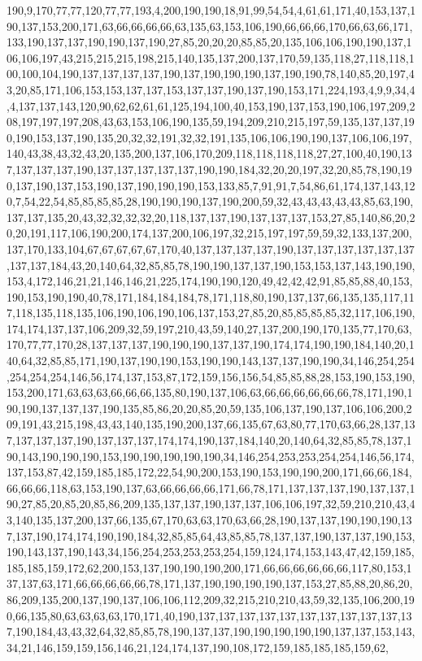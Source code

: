 190,9,170,77,77,120,77,77,193,4,200,190,190,18,91,99,54,54,4,61,61,171,40,153,137,190,137,153,200,171,63,66,66,66,66,63,135,63,153,106,190,66,66,66,170,66,63,66,171,133,190,137,137,190,190,137,190,27,85,20,20,20,85,85,20,135,106,106,190,190,137,106,106,197,43,215,215,215,198,215,140,135,137,200,137,170,59,135,118,27,118,118,100,100,104,190,137,137,137,137,190,137,190,190,190,137,190,190,78,140,85,20,197,43,20,85,171,106,153,153,137,137,153,137,137,190,137,190,153,171,224,193,4,9,9,34,4,4,137,137,143,120,90,62,62,61,61,125,194,100,40,153,190,137,153,190,106,197,209,208,197,197,197,208,43,63,153,106,190,135,59,194,209,210,215,197,59,135,137,137,190,190,153,137,190,135,20,32,32,191,32,32,191,135,106,106,190,190,137,106,106,197,140,43,38,43,32,43,20,135,200,137,106,170,209,118,118,118,118,27,27,100,40,190,137,137,137,137,190,137,137,137,137,137,190,190,184,32,20,20,197,32,20,85,78,190,190,137,190,137,153,190,137,190,190,190,153,133,85,7,91,91,7,54,86,61,174,137,143,120,7,54,22,54,85,85,85,85,28,190,190,190,137,190,200,59,32,43,43,43,43,43,85,63,190,137,137,135,20,43,32,32,32,32,20,118,137,137,190,137,137,137,153,27,85,140,86,20,20,20,191,117,106,190,200,174,137,200,106,197,32,215,197,197,59,59,32,133,137,200,137,170,133,104,67,67,67,67,67,170,40,137,137,137,137,190,137,137,137,137,137,137,137,137,184,43,20,140,64,32,85,85,78,190,190,137,137,190,153,153,137,143,190,190,153,4,172,146,21,21,146,146,21,225,174,190,190,120,49,42,42,42,91,85,85,88,40,153,190,153,190,190,40,78,171,184,184,184,78,171,118,80,190,137,137,66,135,135,117,117,118,135,118,135,106,190,106,190,106,137,153,27,85,20,85,85,85,85,32,117,106,190,174,174,137,137,106,209,32,59,197,210,43,59,140,27,137,200,190,170,135,77,170,63,170,77,77,170,28,137,137,137,190,190,190,137,137,190,174,174,190,190,184,140,20,140,64,32,85,85,171,190,137,190,190,153,190,190,143,137,137,190,190,34,146,254,254,254,254,254,146,56,174,137,153,87,172,159,156,156,54,85,85,88,28,153,190,153,190,153,200,171,63,63,63,66,66,66,135,80,190,137,106,63,66,66,66,66,66,66,78,171,190,190,190,137,137,137,190,135,85,86,20,20,85,20,59,135,106,137,190,137,106,106,200,209,191,43,215,198,43,43,140,135,190,200,137,66,135,67,63,80,77,170,63,66,28,137,137,137,137,137,190,137,137,137,174,174,190,137,184,140,20,140,64,32,85,85,78,137,190,143,190,190,190,153,190,190,190,190,190,34,146,254,253,253,254,254,146,56,174,137,153,87,42,159,185,185,172,22,54,90,200,153,190,153,190,190,200,171,66,66,184,66,66,66,118,63,153,190,137,63,66,66,66,66,171,66,78,171,137,137,137,190,137,137,190,27,85,20,85,20,85,86,209,135,137,137,190,137,137,106,106,197,32,59,210,210,43,43,140,135,137,200,137,66,135,67,170,63,63,170,63,66,28,190,137,137,190,190,190,137,137,190,174,174,190,190,184,32,85,85,64,43,85,85,78,137,137,190,137,137,190,153,190,143,137,190,143,34,156,254,253,253,253,254,159,124,174,153,143,47,42,159,185,185,185,159,172,62,200,153,137,190,190,190,200,171,66,66,66,66,66,66,117,80,153,137,137,63,171,66,66,66,66,66,78,171,137,190,190,190,190,137,153,27,85,88,20,86,20,86,209,135,200,137,190,137,106,106,112,209,32,215,210,210,43,59,32,135,106,200,190,66,135,80,63,63,63,63,170,171,40,190,137,137,137,137,137,137,137,137,137,137,137,190,184,43,43,32,64,32,85,85,78,190,137,137,190,190,190,190,190,137,137,153,143,34,21,146,159,159,156,146,21,124,174,137,190,108,172,159,185,185,185,159,62,
